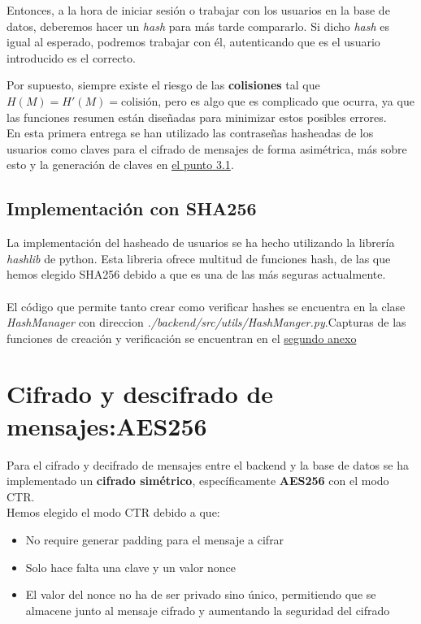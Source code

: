 \documentclass[a4paper,11pt]{article}
\begin{document}
Entonces, a la hora de iniciar sesión o trabajar con los usuarios en la base de datos, deberemos hacer un \textit{hash} para más tarde compararlo. Si dicho \textit{hash} es igual al esperado, podremos trabajar con él, autenticando que es el usuario introducido es el correcto.

Por supuesto, siempre existe el riesgo de las \textbf{colisiones} tal que $H(M) = H'(M) = \text{colisión}$, pero es algo que es complicado que ocurra, ya que las funciones resumen están diseñadas para minimizar estos posibles errores.\\ 

En esta primera entrega se han utilizado las contraseñas hasheadas de los usuarios como claves para el cifrado de mensajes de forma asimétrica, más sobre esto y la generación de claves en \hyperref[sec:generacionUsoDeClaves]{el punto 3.1}.


\subsection{Implementación con SHA256}

La implementación del hasheado de usuarios se ha hecho utilizando la librería
\textit{hashlib} de python. Esta libreria ofrece multitud de funciones hash, de
las que hemos elegido SHA256 debido a que es una de las más seguras
actualmente.\\\\
El código que permite tanto crear como verificar hashes se encuentra en la clase
\textit{HashManager} con direccion
\textit{./backend/src/utils/HashManger.py}.Capturas de las funciones de creación y
verificación se encuentran en el \hyperref[sec:funcionesHash]{segundo anexo}


\section{Cifrado y descifrado de mensajes:AES256}
Para el cifrado y decifrado de mensajes entre el backend y la base de datos se ha implementado un \textbf{cifrado simétrico}, específicamente \textbf{AES256} con el modo CTR.\\
Hemos elegido el modo CTR debido a que:
\begin{itemize}
    \item No require generar padding para el mensaje a cifrar
    \item Solo hace falta una clave y un valor nonce
    \item El valor del nonce no ha de ser privado sino único, permitiendo que se almacene junto al mensaje cifrado y aumentando la seguridad del cifrado
\end{itemize}
\end{document}
